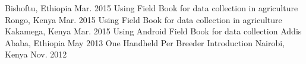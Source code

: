 \begin{cvworkshops}
    {Bishoftu, Ethiopia} %
    {Mar. 2015} %
  \cvworkshop
    {Using Field Book for data collection in agriculture} %
    {Rongo, Kenya} %
    {Mar. 2015} %
  \cvworkshop
    {Using Field Book for data collection in agriculture} %
    {Kakamega, Kenya} %
    {Mar. 2015} %
  \cvworkshop
    {Using Android Field Book for data collection} %
    {Addis Ababa, Ethiopia} %
    {May 2013} %
  \cvworkshop
    {One Handheld Per Breeder Introduction} %
    {Nairobi, Kenya} %
    {Nov. 2012} %
\end{cvworkshops}